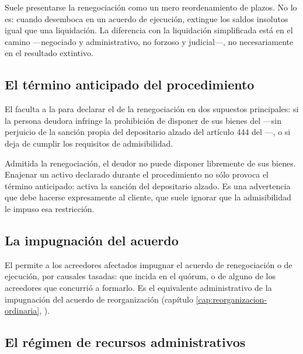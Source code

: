 \begin{foco}
Suele presentarse la renegociación como un mero reordenamiento de plazos. No lo es: cuando
desemboca en un acuerdo de ejecución, extingue los saldos insolutos igual que una
liquidación. La diferencia con la liquidación simplificada está en el camino ---negociado y
administrativo, no forzoso y judicial---, no necesariamente en el resultado extintivo.
\end{foco}

\subsection{El término anticipado del procedimiento}

El  faculta a la \superir{} para declarar el  de la
renegociación en dos supuestos principales: si la persona deudora infringe la prohibición de
disponer de sus bienes del   ---sin perjuicio de la sanción propia del depositario
alzado del artículo 444 del \cpc{}---, o si deja de cumplir los requisitos de admisibilidad.

\begin{alerta}
Admitida la renegociación, el deudor no puede disponer libremente de sus bienes. Enajenar un
activo declarado durante el procedimiento no sólo provoca el término anticipado: activa la
sanción del depositario alzado. Es una advertencia que debe hacerse expresamente al cliente, que
suele ignorar que la admisibilidad le impuso esa restricción.
\end{alerta}

\subsection{La impugnación del acuerdo}

El  permite a los acreedores afectados impugnar el acuerdo de renegociación o de
ejecución, por causales tasadas:  que incida en el
quórum, o  de alguno de los acreedores que concurrió
a formarlo. Es el equivalente administrativo de la impugnación del acuerdo de reorganización
(capítulo \ref{cap:reorganizacion-ordinaria}, ).

\subsection{El régimen de recursos administrativos}

